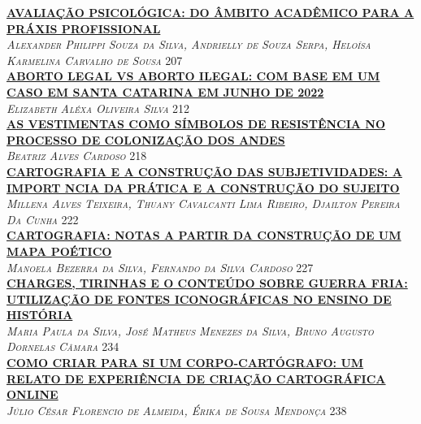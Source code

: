 \noindent \textsc{\hyperlink{trabalhos/251796.pdf.1}{\textbf{AVALIAÇÃO PSICOLÓGICA: DO  ÂMBITO ACADÊMICO PARA A PRÁXIS PROFISSIONAL}}}\\ 
\noindent \textsc{\textit{Alexander Philippi Souza da Silva, Andrielly de Souza Serpa, Heloísa Karmelina Carvalho de Sousa}} \hfill 207\\ 

\noindent \textsc{\hyperlink{trabalhos/241084.pdf.1}{\textbf{ABORTO LEGAL VS ABORTO ILEGAL: COM BASE EM UM CASO EM SANTA CATARINA EM JUNHO DE 2022}}}\\ 
\noindent \textsc{\textit{Elizabeth Aléxa Oliveira Silva}} \hfill 212\\ 

\noindent \textsc{\hyperlink{trabalhos/250414.pdf.1}{\textbf{AS VESTIMENTAS COMO SÍMBOLOS DE RESISTÊNCIA NO PROCESSO DE COLONIZAÇÃO DOS ANDES }}}\\ 
\noindent \textsc{\textit{Beatriz Alves Cardoso}} \hfill 218\\ 

\noindent \textsc{\hyperlink{trabalhos/251849.pdf.1}{\textbf{CARTOGRAFIA E A CONSTRUÇÃO DAS SUBJETIVIDADES: A IMPORT NCIA DA PRÁTICA E A CONSTRUÇÃO DO SUJEITO}}}\\ 
\noindent \textsc{\textit{Millena Alves Teixeira, Thuany Cavalcanti Lima Ribeiro, Djailton Pereira Da Cunha}} \hfill 222\\ 

\noindent \textsc{\hyperlink{trabalhos/251799.pdf.1}{\textbf{CARTOGRAFIA: NOTAS A PARTIR DA CONSTRUÇÃO DE UM MAPA POÉTICO}}}\\ 
\noindent \textsc{\textit{Manoela Bezerra da Silva, Fernando da Silva Cardoso}} \hfill 227\\ 

\noindent \textsc{\hyperlink{trabalhos/245112.pdf.1}{\textbf{CHARGES, TIRINHAS E O CONTEÚDO SOBRE GUERRA FRIA: UTILIZAÇÃO DE FONTES ICONOGRÁFICAS NO ENSINO DE HISTÓRIA}}}\\ 
\noindent \textsc{\textit{Maria Paula da Silva, José Matheus Menezes da Silva, Bruno Augusto Dornelas Câmara}} \hfill 234\\ 

\noindent \textsc{\hyperlink{trabalhos/249405.pdf.1}{\textbf{COMO CRIAR PARA SI UM CORPO-CARTÓGRAFO: UM RELATO DE EXPERIÊNCIA DE CRIAÇÃO CARTOGRÁFICA ONLINE}}}\\ 
\noindent \textsc{\textit{Júlio César Florencio de Almeida, Érika de Sousa Mendonça}} \hfill 238\\ 

